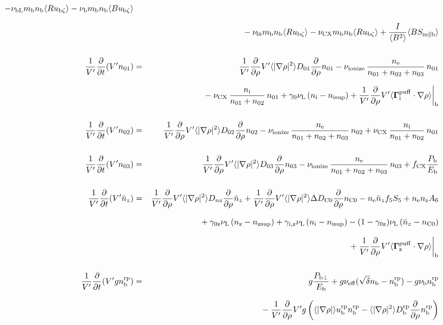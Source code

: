 \documentclass[11pt]{article}
\def\bvec#1{\leavevmode\hbox{\boldmath$#1$}}
\let\vec=\bvec
\def\r#1{{\rm#1}}
\def\aves#1{\langle#1\rangle}
\def\dd#1#2{\frac{\partial #1}{\partial #2}}
\def\para{\parallel}
\def\ddrho{\frac{\partial}{\partial\rho}}
\def\ddV{\frac{\partial}{\partial V}}
\def\ddt{\frac{\partial}{\partial t}}
\def\mi{m_\r{i}}
\def\mb{m_\r{b}}
\def\nee{n_\r{e}}
\def\ni{n_\r{i}}
\def\nz{n_\r{z}}
\def\nb{n_\r{b}}
\def\Te{T_\r{e}}
\def\Zi{Z_\r{i}}
\def\uzt#1{u_{\r{#1}\zeta}}
\def\upara#1{u_{\r{#1}\para}}
\def\De{D_\r{e}}
\def\nun#1{\nu_\r{0#1}}
\def\nsup#1{n_\r{#1sup}}
\def\nbrp{n_\r{b}^\r{rp}}
\def\ubrp{u_\r{b}^\r{rp}}
\def\Dbrp{D_\r{b}^\r{rp}}
\def\bri{\aves{B^2}\aves{R^2} - I^2}
\def\Pbperp{P_{\r{b}\perp}}
\def\Pb{P_\r{b}}
\def\Eb{E_\r{b}}
\def\nna{n_{01}}
\def\nnb{n_{02}}
\def\nnc{n_{03}}
\def\nnz{\bar{n}_{z}}
\def\nueff{\nu_\r{eff}}
\def\fCX{f_\r{CX}}
\def\nuL{\nu_\r{L}}
\def\nuCX{\nu_\r{CX}}
\def\nuion{\nu_\r{ionize}}
\def\nub{\nu_\r{b}}
\def\nuOL{\nu_\r{OL}}
\def\nubL{\nu_\r{bL}}
\def\red#1{\textcolor{red}{#1}}
\begin{document}
\begin{eqnarray}
%
  - \nubL \mb \nb \aves{R \uzt{b}}
%
  - \nub  \mb \nb \aves{B \uzt{b}}
\nonumber\\[2.5mm]&&{}
%
  - \nun{i} \mb \nb \aves{R \uzt{b}}
%
  - \nuCX \mb \nb \aves{R \uzt{b}}
%
%
  + \frac{I}{\aves{B^2}} \aves{B S_{\r{m}\para\r{b}}}
%
\\[5mm]
  \frac{1}{V'} \ddt (V' \nna) &=& 
%
    \frac{1}{V'} \ddrho V' \aves{|\nabla\rho|^2} D_{01} \ddrho \nna
%
  - \nuion\, \frac{\nee}{\nna + \nnb + \nnc}\, \nna
%
\nonumber\\[2.5mm]&&{}
  - \nuCX\, \frac{\ni}{\nna + \nnb}\, \nna
%
  + \gamma_0 \nuL \, (\ni - \nsup{i})
%
  + \frac{1}{V'} \ddrho V' \aves{\vec{\Gamma}^\r{puff}_\r{i}\cdot\nabla\rho}\biggr|_\r{b}
\\[5mm]
  \frac{1}{V'} \ddt (V' \nnb) &=& 
%
    \frac{1}{V'} \ddrho V' \aves{|\nabla\rho|^2} D_{02} \ddrho \nnb
%
  - \nuion\, \frac{\nee}{\nna + \nnb + \nnc}\, \nnb
%
  + \nuCX\, \frac{\ni}{\nna + \nnb}\, \nna
%
\\[5mm]
  \frac{1}{V'} \ddt (V' \nnc) &=& 
%
    \frac{1}{V'} \ddrho V' \aves{|\nabla\rho|^2} D_{03} \ddrho \nnc
%
  - \nuion\, \frac{\nee}{\nna + \nnb + \nnc}\, \nnc
%
  + \fCX \frac{\Pb}{\Eb}
\\[5mm]
  \frac{1}{V'} \ddt (V' \nnz) &=& 
%
    \frac{1}{V'} \ddrho V' \aves{|\nabla\rho|^2} D_{n\r{z}} \ddrho \nnz
%
  + \frac{1}{V'} \ddrho V' \aves{|\nabla\rho|^2} \Delta D_{\r{C0}} \ddrho n_\r{C0}
%
  - \nee \nnz f_5S_5 + \nee \nz A_6 
\nonumber\\[2.5mm]&&{}
%
  + \gamma_\r{0z} \nuL \, (\nz - \nsup{z})
%
  + \gamma_\r{i,z} \nuL \, (\ni - \nsup{i})
%
  - (1-\gamma_\r{0z}) \nuL \, (\nnz - n_\r{C0})
\nonumber\\[2.5mm]&&{}
%
  + \frac{1}{V'} \ddrho V' \aves{\vec{\Gamma}^\r{puff}_\r{z}\cdot\nabla\rho}\biggr|_\r{b}
\\[5mm]
  \frac{1}{V'} \ddt (V' g \nbrp) &=&
%
    g \frac{\Pbperp}{\Eb}
%
  + g \nueff (\sqrt{\delta} \nb - \nbrp)
%
  - g \nub \nbrp
%
\nonumber\\[2.5mm]&&{}
  - \frac{1}{V'} \ddrho V' g \left( \aves{|\nabla\rho|} \ubrp \nbrp - \aves{|\nabla\rho|^2} \Dbrp \ddrho \nbrp \right)
%
\end{eqnarray}
\end{document}
